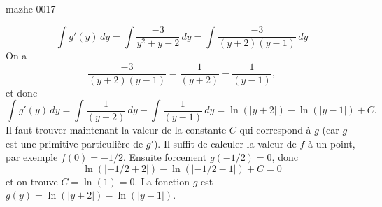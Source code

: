 \begin{corrige}{mazhe-0017}
\begin{enumerate}
\begin{equation*}
   \int g'(y)\,dy =\int \frac{-3}{y^2 +y-2}\,dy = \int \frac{-3}{(y+2)(y-1)}\,dy
 \end{equation*}
On a 
\begin{equation*}
  \frac{-3}{(y+2)(y-1)} = \frac{1}{(y+2)} - \frac{1}{(y-1)},
\end{equation*}
et donc 
\begin{equation*}
 \int g'(y)\,dy = \int\frac{1}{(y+2)} \,dy - \int \frac{1}{(y-1)}\,dy = \ln(|y+2|) - \ln(|y-1|) +C. 
\end{equation*}
Il faut trouver maintenant la valeur de la constante $C$ qui correspond \`a $g$ (car $g$ est une primitive particulière de $g'$). Il suffit de calculer la valeur de $f$ \`a un point, par exemple $f(0) = -1/2$. Ensuite forcement $g(-1/2) = 0$, donc 
\begin{equation*}
  \ln(|-1/2+2|) - \ln(|-1/2-1|) +C =0
\end{equation*}
et on trouve $C =\ln(1) =0 $. La fonction $g$ est $g(y) =\ln(|y+2|) - \ln(|y-1|) $.
\end{enumerate}
\end{corrige}
